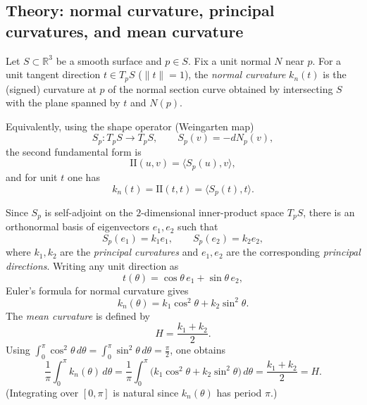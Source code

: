 \documentclass[12pt,a4paper]{article}
\theoremstyle{plain}
\theoremstyle{definition}      %
\begin{document}
\subsection*{Theory: normal curvature, principal curvatures, and mean curvature}

Let $S\subset\mathbb R^3$ be a smooth surface and $p\in S$. Fix a unit normal $N$ near $p$.
For a unit tangent direction $t\in T_pS$ ($\|t\|=1$), the \emph{normal curvature} $k_n(t)$
is the (signed) curvature at $p$ of the normal section curve obtained by intersecting $S$
with the plane spanned by $t$ and $N(p)$.

Equivalently, using the shape operator (Weingarten map)
\[
S_p:T_pS\to T_pS,\qquad S_p(v)=-dN_p(v),
\]
the second fundamental form is
\[
\mathrm{II}(u,v)=\langle S_p(u),v\rangle,
\]
and for unit $t$ one has
\[
k_n(t)=\mathrm{II}(t,t)=\langle S_p(t),t\rangle.
\]

Since $S_p$ is self-adjoint on the $2$-dimensional inner-product space $T_pS$, there is an
orthonormal basis of eigenvectors $e_1,e_2$ such that
\[
S_p(e_1)=k_1 e_1,\qquad S_p(e_2)=k_2 e_2,
\]
where $k_1,k_2$ are the \emph{principal curvatures} and $e_1,e_2$ are the corresponding
\emph{principal directions}. Writing any unit direction as
\[
t(\theta)=\cos\theta\,e_1+\sin\theta\,e_2,
\]
Euler's formula for normal curvature gives
\[
k_n(\theta)=k_1\cos^2\theta+k_2\sin^2\theta.
\]
The \emph{mean curvature} is defined by
\[
H=\frac{k_1+k_2}{2}.
\]
Using $\int_0^\pi \cos^2\theta\,d\theta=\int_0^\pi \sin^2\theta\,d\theta=\frac{\pi}{2}$,
one obtains
\[
\frac1\pi\int_0^\pi k_n(\theta)\,d\theta
=\frac1\pi\int_0^\pi\bigl(k_1\cos^2\theta+k_2\sin^2\theta\bigr)\,d\theta
=\frac{k_1+k_2}{2}=H.
\]
(Integrating over $[0,\pi]$ is natural since $k_n(\theta)$ has period $\pi$.)

\end{document}
